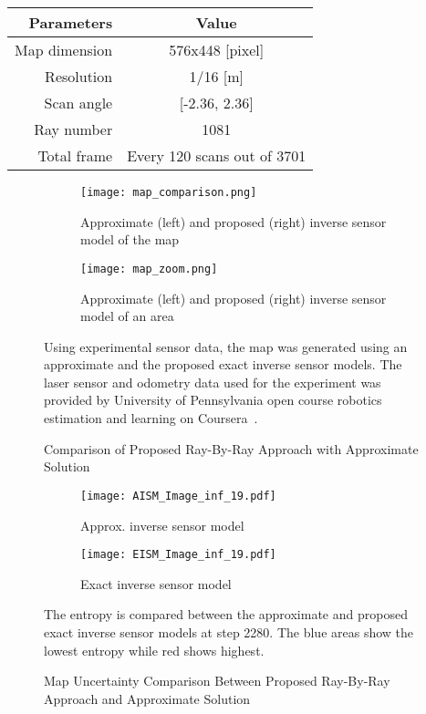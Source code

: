 \begin{center}
\label{tab:penn}
    \begin{tabular}{r | c}
        Parameters & Value\\ \hline\hline
        Map dimension & 576x448 [pixel]\\
        Resolution & 1/16 [m]\\
        Scan angle & [-2.36, 2.36]\\
        Ray number & 1081\\
        Total frame & Every 120 scans out of 3701\\
    \end{tabular}
\end{center}

\begin{figure}[!ht]
    \centering
    \begin{subfigure}[t]{0.8\columnwidth}
        \centering
        \texttt{[image: map\_comparison.png]}
        \caption{Approximate (left) and proposed (right) inverse sensor model of the map}
        \label{fig:penn_map_total}
    \end{subfigure}
    \begin{subfigure}[t]{0.8\columnwidth}
        \centering
        \texttt{[image: map\_zoom.png]}
        \caption{Approximate (left) and proposed (right) inverse sensor model of an area}
        \label{fig:penn_map_zoom}
    \end{subfigure}
    \caption{Comparison of Proposed Ray-By-Ray Approach with Approximate Solution}
	\medskip
	\small
	Using experimental sensor data, the map was generated using an approximate and the proposed exact inverse sensor models. The laser sensor and odometry data used for the experiment was provided by University of Pennsylvania open course robotics estimation and learning on Coursera~\cite{coursera}.
    \label{fig:penn_map}
\end{figure}


\begin{figure}[!ht]
    \centering
    \begin{subfigure}[t]{0.35\columnwidth}
        \centering
        \texttt{[image: AISM\_Image\_inf\_19.pdf]}
        \caption{Approx. inverse sensor model}
        \label{fig:AISM}
    \end{subfigure}
    \begin{subfigure}[t]{0.35\columnwidth}
        \centering
        \texttt{[image: EISM\_Image\_inf\_19.pdf]}
        \caption{Exact inverse sensor model}
        \label{fig:EISM}
    \end{subfigure}
    \caption{Map Uncertainty Comparison Between Proposed Ray-By-Ray Approach and Approximate Solution}
	\medskip
	\small
	The entropy is compared between the approximate and proposed exact inverse sensor models at step 2280. The blue areas show the lowest entropy while red shows highest.
\label{fig:entropy_comp}
\end{figure}


